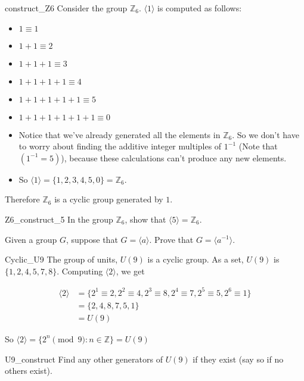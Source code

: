 \begin{example}{construct_Z6}
Consider the group ${\mathbb Z}_6$.  $\langle 1 \rangle$ is computed as follows:
\begin{itemize}
\item
$1 \equiv 1$
\item
$1 + 1 \equiv 2$ 
\item
$1 + 1 + 1 \equiv 3$ 
\item
$1 + 1 + 1 + 1 \equiv 4$ 
\item
$1 + 1 + 1 + 1 + 1 \equiv 5$ 
\item
$1 + 1 + 1 + 1 + 1 + 1 \equiv 0$
\item
Notice that we've already generated all the elements in ${\mathbb Z}_6$. So we don't have to worry about finding the additive integer multiples of $1^{-1}$ (Note that $(1^{-1} = 5)$), because these calculations can't produce any new elements.
\item
So $\langle 1 \rangle = \{1, 2, 3, 4, 5, 0 \} = {\mathbb Z}_6$.
\end{itemize}

\noindent
Therefore ${\mathbb Z}_6$ is a cyclic group generated by $1$.
\end{example}

\begin{exercise}{Z6_construct_5}
In the group ${\mathbb Z}_6$, show that $\langle 5 \rangle = {\mathbb Z}_6$.
\end{exercise}

\begin{exercise}{82}
Given a group $G$, suppose that $G = \langle a \rangle$.  Prove that $G = \langle a^{-1} \rangle$.
\end{exercise}

\begin{example}{Cyclic_U9}
The group of units, $U(9)$ is a cyclic group.  As a
set, $U(9)$ is $\{ 1, 2, 4, 5, 7, 8  \}$. Computing $\langle 2 \rangle$, we get 

\begin{align*}
 \langle 2 \rangle &= \{ 2^1 \equiv 2, 2^2 \equiv 4, 2^3 \equiv 8, 2^4 \equiv 7, 2^5 \equiv 5, 2^6 \equiv 1 \} \\
 &= \{2, 4, 8, 7, 5, 1\} \\
 &= U(9)
 \end{align*}

\noindent
So $\langle 2 \rangle = \{ 2^n \pmod{9} : n \in \mathbb Z \} = U(9)$
\end{example}

\begin{exercise}{U9_construct}
Find any other generators of $U(9)$ if they exist (say so if no others exist).
\end{exercise}

